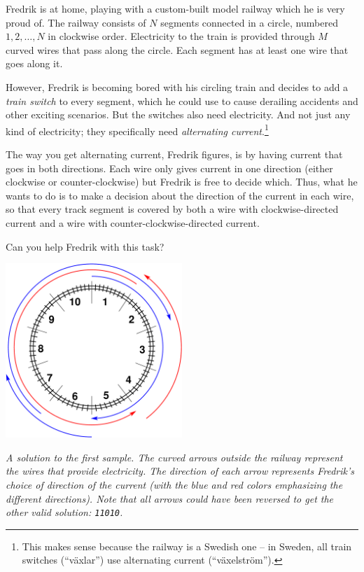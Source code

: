 \ifx\boi\undefined\fi
\def\version{jury-1}
Fredrik is at home, playing with a custom-built model railway which he is very proud of.
The railway consists of $N$ segments connected in a circle, numbered $1, 2, \dots, N$ in clockwise order.
Electricity to the train is provided through $M$ curved wires that pass along the
circle. Each segment has at least one wire that goes along it.

However, Fredrik is becoming bored with his circling train and decides to add a \emph{train switch} to every segment, which he could use to cause derailing accidents and other exciting scenarios. But the switches also need electricity.
And not just any kind of electricity; they specifically need \emph{alternating current}.\footnote{This makes sense because the railway is a Swedish one -- in Sweden, all train switches (``växlar'') use alternating current (``växelström'').}

The way you get alternating current, Fredrik figures, is by having current
that goes in both directions. Each wire only gives current in one direction
(either clockwise or counter-clockwise) but Fredrik is free to decide which.
Thus, what he wants to do is to make a decision about the direction of the current in each wire,
so that every track segment is covered by both a wire with clockwise-directed current and a wire with 
counter-clockwise-directed current.

Can you help Fredrik with this task?

\vspace{2mm}
\begin{center}
\includegraphics[width=0.5\textwidth]{alternatingfig.pdf}
\end{center}
\vspace{1mm}
{\em A solution to the first sample. The curved arrows outside the railway represent the wires that provide electricity. The direction of each arrow represents Fredrik's choice of direction of the current (with the blue and red colors emphasizing the different directions). Note that all arrows could have been reversed to get the other valid solution: \texttt{11010}.}

